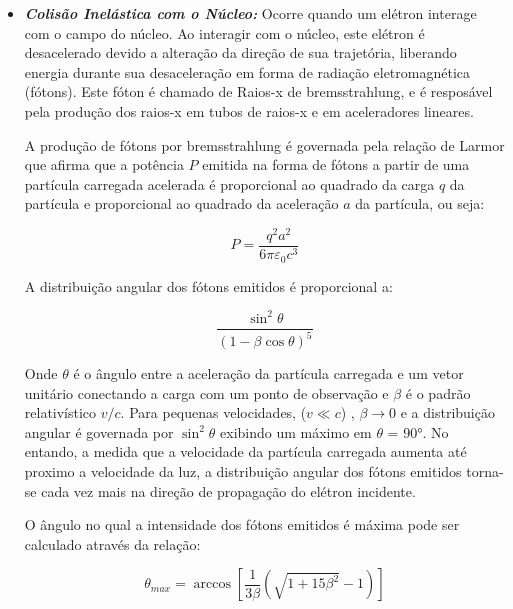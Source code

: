\documentclass[11pt,a4paper]{article}
\begin{document}
\begin{itemize}
                \item \textbf{\textit{\textcolor{CarnationPink}{Colisão Inelástica com o Núcleo}:}} Ocorre quando um elétron interage com o campo do núcleo. Ao interagir com o núcleo, este elétron é desacelerado devido a alteração da direção de sua trajetória, liberando energia durante sua desaceleração em forma de radiação eletromagnética (fótons). Este fóton é chamado de Raios-x de bremsstrahlung, e é resposável pela produção dos raios-x em tubos de raios-x e em aceleradores lineares.
                    
                A produção de fótons por bremsstrahlung é governada pela relação de Larmor que afirma que a potência $P$ emitida na forma de fótons a partir de uma partícula carregada acelerada é proporcional ao quadrado da carga $q$ da partícula e proporcional ao quadrado da aceleração $a$ da partícula, ou seja:

                    \begin{equation}
                        P = \frac{q^2 a^2}{6 \pi \varepsilon_0 c^3}
                    \end{equation}

                A distribuição angular dos fótons emitidos é proporcional a:

                    \begin{equation}
                        \frac{\sin^2 \theta}{(1 - \beta \cos \theta )^5}
                    \end{equation}
                
                Onde $\theta$ é o ângulo entre a aceleração da partícula carregada e um vetor unitário conectando a carga com um ponto de observação e $\beta$ é o padrão relativístico $v/c$. Para pequenas velocidades, ($v \ll c$) , $\beta \rightarrow 0$ e a distribuição angular é governada por $\sin^2\theta$ exibindo um máximo em $\theta$ = \ang{90}. No entando, a medida que a velocidade da partícula carregada aumenta até proximo a velocidade da luz, a distribuição angular dos fótons emitidos torna-se cada vez mais na direção de propagação do elétron incidente. 

                O ângulo no qual a intensidade dos fótons emitidos é máxima pode ser calculado através da relação:

                    \begin{equation}
                        \theta_{max} = \arccos \left[ \frac{1}{3\beta} \left(\sqrt{1 + 15 \beta^2} - 1 \right)\right] 
                    \end{equation}


\end{itemize}
\end{document}
